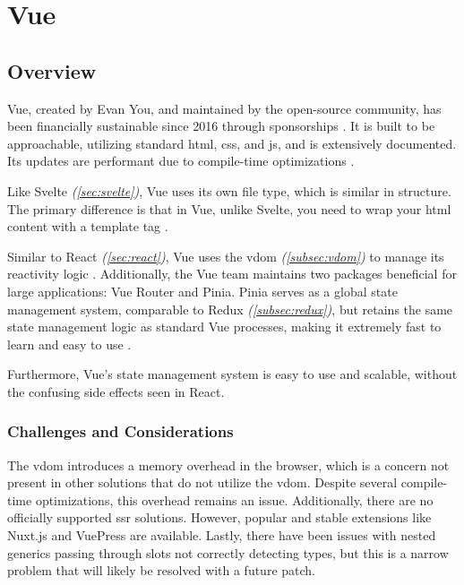 \section{Vue}
\label{sec:vue}

\subsection{Overview}
\label{subsec:vue:overview}

Vue, created by Evan You, and maintained by the open-source community, has been financially sustainable since 2016 through sponsorships \cite{vue:sponsor,vue:faq}. It is built to be approachable, utilizing standard \acrshort{html}, \acrshort{css}, and \acrshort{js}, and is extensively documented. Its updates are performant due to compile-time optimizations \cite{vue:home}.

Like Svelte \textit{(\ref{sec:svelte})}, Vue uses its own file type, which is similar in structure. The primary difference is that in Vue, unlike Svelte, you need to wrap your \acrshort{html} content with a template tag \cite{svelte:components, vue:template_syntax}.

Similar to React \textit{(\ref{sec:react})}, Vue uses the \acrshort{vdom} \textit{(\ref{subsec:vdom})} to manage its reactivity logic \cite{react:vdom,vue:rendering_mechanism}. Additionally, the Vue team maintains two packages beneficial for large applications: Vue Router and Pinia. Pinia serves as a global state management system, comparable to Redux \textit{(\ref{subsec:redux})}, but retains the same state management logic as standard Vue processes, making it extremely fast to learn and easy to use \cite{vue:router,vue:pinia}.

Furthermore, Vue's state management system is easy to use and scalable, without the confusing side effects seen in React.

\subsubsection{Challenges and Considerations}
\label{subsec:vue:challenges}

The \acrshort{vdom} introduces a memory overhead in the browser, which is a concern not present in other solutions that do not utilize the \acrshort{vdom}. Despite several compile-time optimizations, this overhead remains an issue. Additionally, there are no officially supported \acrshort{ssr} solutions. However, popular and stable extensions like Nuxt.js and VuePress are available. Lastly, there have been issues with nested generics passing through slots not correctly detecting types, but this is a narrow problem that will likely be resolved with a future patch.

